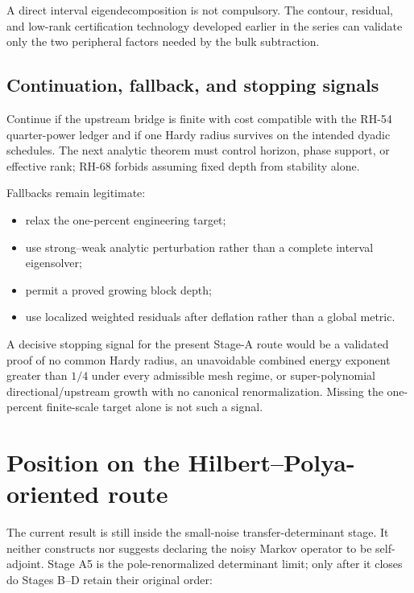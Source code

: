 \documentclass[11pt]{article}
\theoremstyle{definition}
\begin{document}
A direct interval eigendecomposition is not compulsory.  The contour,
residual, and low-rank certification technology developed earlier in the
series can validate only the two peripheral factors needed by the bulk
subtraction.

\subsection{Continuation, fallback, and stopping signals}

Continue if the upstream bridge is finite with cost compatible with the
RH-54 quarter-power ledger and if one Hardy radius survives on the intended
dyadic schedules.  The next analytic theorem must control horizon, phase
support, or effective rank; RH-68 forbids assuming fixed depth from stability
alone.

Fallbacks remain legitimate:

\begin{itemize}[leftmargin=2.2em]
 \item relax the one-percent engineering target;
 \item use strong--weak analytic perturbation rather than a complete interval
       eigensolver;
 \item permit a proved growing block depth;
 \item use localized weighted residuals after deflation rather than a global
       metric.
\end{itemize}

A decisive stopping signal for the present Stage-A route would be a validated
proof of no common Hardy radius, an unavoidable combined energy exponent
greater than $1/4$ under every admissible mesh regime, or super-polynomial
directional/upstream growth with no canonical renormalization.  Missing the
one-percent finite-scale target alone is not such a signal.

\section{Position on the Hilbert--Polya-oriented route}
\label{sec:hp}

The current result is still inside the small-noise transfer-determinant
stage.  It neither constructs nor suggests declaring the noisy Markov
operator to be self-adjoint.  Stage A5 is the pole-renormalized determinant
limit; only after it closes do Stages B--D retain their original order:
\end{document}

